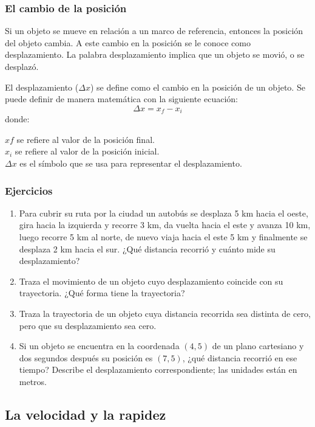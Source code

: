 \documentclass[11pt]{book}
\begin{document}
\subsubsection{El cambio de la posición}
Si un objeto se mueve en relación a un marco de referencia, entonces la posición del objeto
cambia. A este cambio en la posición se le conoce como desplazamiento. La palabra desplazamiento
implica que un objeto se movió, o se desplazó.

El desplazamiento ($\Delta x$) se define como el cambio en la posición de un objeto.
Se puede definir de
manera matemática con la siguiente ecuación:
\[\Delta x = x_f - x_i\]
donde:

$xf$ se refiere al valor de la posición final.\\
$x_i$ se refiere al valor de la posición inicial.\\
$\Delta x$ es el símbolo que se usa para representar el desplazamiento.\\

\subsubsection{Ejercicios}
\begin{enumerate}
  \item Para cubrir su ruta por la ciudad un autobús se desplaza 5 km hacia el oeste, gira hacia la izquierda y recorre 3 km, da vuelta hacia el este y avanza 10 km, luego recorre 5 km al norte, de nuevo viaja hacia el este 5 km y finalmente se desplaza 2 km hacia el sur. ¿Qué distancia recorrió y cuánto mide su desplazamiento?
  \item Traza el movimiento de un objeto cuyo desplazamiento coincide con su trayectoria. ¿Qué forma tiene la trayectoria?
  \item Traza la trayectoria de un objeto cuya distancia recorrida sea distinta de cero,
        pero que su desplazamiento sea cero.
  \item Si un objeto se encuentra en la coordenada $(4, 5)$ de un plano cartesiano y dos
        segundos después su posición es $(7, 5)$, ¿qué distancia recorrió en ese tiempo?
        Describe el desplazamiento correspondiente; las unidades están en metros.
\end{enumerate}

\newpage
\subsection{La velocidad y la rapidez}
\end{document}

